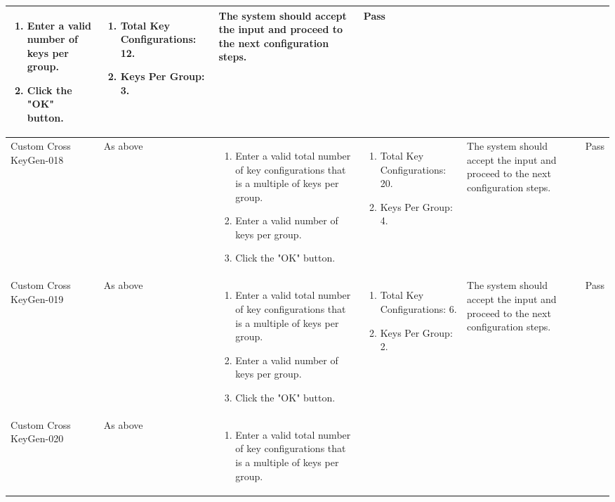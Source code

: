 \documentclass[]{final_report}
\theoremstyle{definition}
\begin{document}
\begin{longtable}{|p{1.5cm}|p{2.5cm}|p{3.5cm}|p{3cm}|p{3cm}|p{2cm}|}
\begin{enumerate}
    \item Enter a valid number of keys per group.
    \item Click the "OK" button.
  \end{enumerate} &  \begin{enumerate}
    \item Total Key Configurations: 12.
    \item Keys Per Group: 3.
   \end{enumerate}  & The system should accept the input and proceed to the next configuration steps. & Pass \\
  \hline
  Custom
  Cross
  KeyGen-018 & As above & 
  \begin{enumerate}
    \item Enter a valid total number of key configurations that is a multiple of keys per group.
    \item Enter a valid number of keys per group.
    \item Click the "OK" button.
  \end{enumerate} &  \begin{enumerate}
    \item Total Key Configurations: 20.
    \item Keys Per Group: 4.
   \end{enumerate}  & The system should accept the input and proceed to the next configuration steps. & Pass \\
  \hline
  Custom
  Cross
  KeyGen-019 & As above & 
  \begin{enumerate}
    \item Enter a valid total number of key configurations that is a multiple of keys per group.
    \item Enter a valid number of keys per group.
    \item Click the "OK" button.
  \end{enumerate} &  \begin{enumerate}
    \item Total Key Configurations: 6.
    \item Keys Per Group: 2.
   \end{enumerate}  & The system should accept the input and proceed to the next configuration steps. & Pass \\
  \hline
  Custom
  Cross
  KeyGen-020 & As above & 
  \begin{enumerate}
    \item Enter a valid total number of key configurations that is a multiple of keys per group.

\end{enumerate}
\end{longtable}
\end{document}
